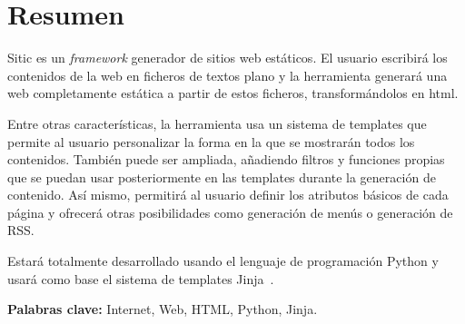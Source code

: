 \section*{Resumen}

Sitic es un \textit{framework} generador de sitios web estáticos. El usuario escribirá
los contenidos de la web en ficheros de textos plano y la
herramienta generará una web completamente estática a partir de estos ficheros,
transformándolos en html.

Entre otras características, la herramienta usa un sistema de templates que permite al
usuario personalizar la forma en la que se mostrarán todos los contenidos. También puede
ser ampliada, añadiendo filtros y funciones propias que se puedan usar posteriormente en
las templates durante la generación de contenido. Así mismo, permitirá al usuario definir los
atributos básicos de cada página y ofrecerá otras posibilidades como generación de menús
o generación de RSS.

Estará totalmente desarrollado usando el lenguaje de programación Python y usará como
base el sistema de templates Jinja~\cite{jinja}.

\textbf{Palabras clave:} Internet, Web, HTML, Python, Jinja.


